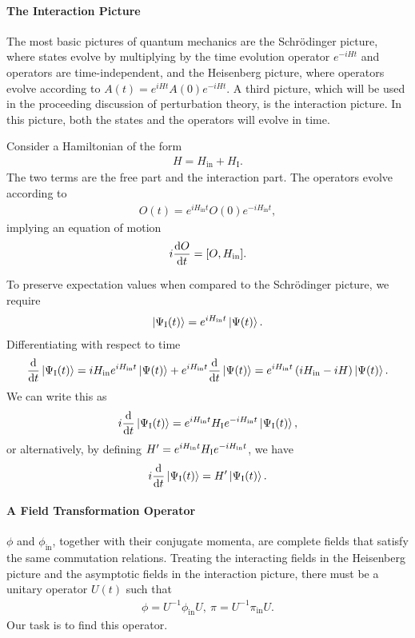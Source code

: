 \paragraph{The Interaction Picture}
The most basic pictures of quantum mechanics are the Schrödinger picture, where states evolve by multiplying by the time evolution operator $e^{-iHt}$ and operators are time-independent, and the Heisenberg picture, where operators evolve according to $A(t) = e^{iHt}A(0)e^{-iHt}$. A third picture, which will be used in the proceeding discussion of perturbation theory, is the interaction picture. In this picture, both the states and the operators will evolve in time.

Consider a Hamiltonian of the form
\begin{align*}
	H = H_{\text{in}} + H_{\text{I}}.
\end{align*}
The two terms are the free part and the interaction part. The operators evolve according to
\begin{align*}
	O(t) = e^{iH_{\text{in}}t}O(0)e^{-iH_{\text{in}}t},
\end{align*}
implying an equation of motion
\begin{align*}
	i\dv{O}{t} = \comm{O}{H_{\text{in}}}.
\end{align*}

To preserve expectation values when compared to the Schrödinger picture, we require
\begin{align*}
	\ket{\Psi_{\text{I}}(t)} = e^{iH_{\text{in}}t}\ket{\Psi(t)}.
\end{align*}
Differentiating with respect to time
\begin{align*}
	\dv{t}\ket{\Psi_{\text{I}}(t)} = iH_{\text{in}}e^{iH_{\text{in}}t}\ket{\Psi(t)} + e^{iH_{\text{in}}t}\dv{t}\ket{\Psi(t)} = e^{iH_{\text{in}}t}\left(iH_{\text{in}} - iH\right)\ket{\Psi(t)}.
\end{align*}
We can write this as
\begin{align*}
	i\dv{t}\ket{\Psi_{\text{I}}(t)} = e^{iH_{\text{in}}t}H_{\text{I}}e^{-iH_{\text{in}}t}\ket{\Psi_{\text{I}}(t)},
\end{align*}
or alternatively, by defining $H^{\prime} = e^{iH_{\text{in}}t}H_{\text{I}}e^{-iH_{\text{in}}t}$, we have
\begin{align*}
	i\dv{t}\ket{\Psi_{\text{I}}(t)} = H^{\prime}\ket{\Psi_{\text{I}}(t)}.
\end{align*}

\paragraph{A Field Transformation Operator}
$\phi$ and $\phi_{\text{in}}$, together with their conjugate momenta, are complete fields that satisfy the same commutation relations. Treating the interacting fields in the Heisenberg picture and the asymptotic fields in the interaction picture, there must be a unitary operator $U(t)$ such that
\begin{align*}
	\phi = U^{-1}\phi_{\text{in}}U,\ \pi = U^{-1}\pi_{\text{in}}U.
\end{align*}
Our task is to find this operator.

